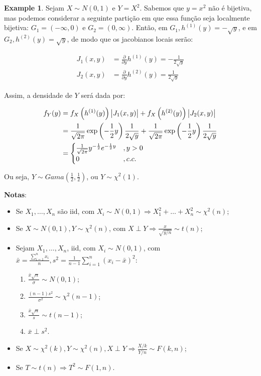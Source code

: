 \documentclass[
]{article}
\providecommand{\tightlist}{%
  \setlength{\itemsep}{0pt}\setlength{\parskip}{0pt}}
\theoremstyle{definition}
\theoremstyle{definition}
\newtheorem{example}{Example}[section]
\theoremstyle{definition}
\theoremstyle{definition}
\theoremstyle{remark}
\begin{document}
\begin{example}
Sejam \(X \sim N(0,1)\) e \(Y = X^{2}\). Sabemos que \(y = x^{2}\) não é bijetiva, mas podemos considerar a seguinte partição em que essa função seja localmente bijetiva: \(G_{1} = (-\infty, 0)\) e \(G_{2} = (0, \infty)\). Então, em \(G_{1}, h^{(1)}(y) = -\sqrt{y}\), e em \(G_{2}, h^{(2)}(y) = \sqrt{y}\), de modo que os jacobianos locais serão:

\begin{align*}
J_{1}(x,y) &= \frac{\partial}{\partial y}h^{(1)}(y) = - \frac{1}{2\sqrt{y}} \\
J_{2}(x,y) &= \frac{\partial}{\partial y}h^{(2)}(y) = \frac{1}{2\sqrt{y}}
\end{align*}

Assim, a densidade de \(Y\) será dada por:

\begin{align*}
f_{Y}(y) &= f_{X}\left(h^{(1)}(y)\right)\big{|}J_{1}(x,y)\big{|} + f_{X}\left(h^{(2)}(y)\right)\big{|}J_{2}(x,y)\big{|} \\
&= \frac{1}{\sqrt{2\pi}}\exp\left(-\frac{1}{2}y\right)\frac{1}{2\sqrt{y}} + \frac{1}{\sqrt{2\pi}}\exp\left(-\frac{1}{2}y\right)\frac{1}{2\sqrt{y}} \\
&= \begin{cases}
\frac{1}{\sqrt{2\pi}}y^{-\frac{1}{2}}e^{-\frac{1}{2}y} & ,y>0 \\
0 & ,c.c.
\end{cases}
\end{align*}

Ou seja, \(Y \sim Gama\left(\frac{1}{2}, \frac{1}{2}\right)\), ou \(Y \sim \chi^{2}(1)\).
\end{example}

\textbf{Notas}:

\begin{itemize}
\tightlist
\item
  Se \(X_{1}, \ldots, X_{n}\) são iid, com \(X_{i} \sim N(0,1) \Rightarrow X_{1}^{2} + \ldots + X_{n}^{2} \sim \chi^{2}(n)\);
\item
  Se \(X \sim N(0,1), Y \sim \chi^{2}(n)\), com \(X \perp Y \Rightarrow \frac{x}{\sqrt{y/n}} \sim t(n)\);
\item
  Sejam \(X_{1}, \ldots, X_{n}\), iid, com \(X_{i} \sim N(0,1)\), com \(\bar{x} = \frac{\sum_{i=1}^{n}x_{i}}{n}, s^{2} = \frac{1}{n-1}\sum_{i=1}^{n}(x_{i} - \bar{x})^{2}\):

  \begin{enumerate}
  \def\labelenumi{\arabic{enumi}.}
  \tightlist
  \item
    \(\frac{\bar{x}\sqrt{n}}{\sigma} \sim N(0,1)\);
  \item
    \(\frac{(n-1)s^{2}}{\sigma^{2}} \sim \chi^{2}(n-1)\);
  \item
    \(\frac{\bar{x}\sqrt{n}}{s} \sim t(n-1)\);
  \item
    \(\bar{x} \perp s^{2}\).
  \end{enumerate}
\item
  Se \(X \sim \chi^{2}(k), Y \sim \chi^{2}(n), X \perp Y \Rightarrow \frac{X/k}{Y/n} \sim F(k,n)\);
\item
  Se \(T \sim t(n) \Rightarrow T^{2} \sim F(1,n)\).
\end{itemize}
\end{document}
